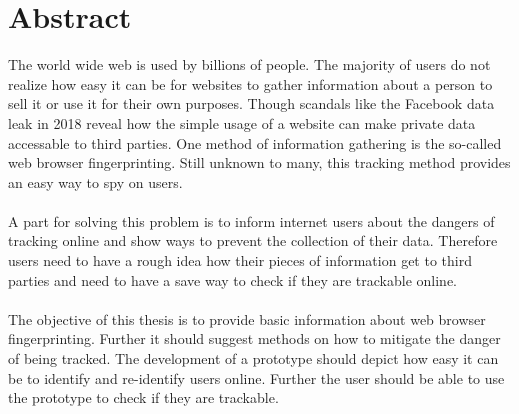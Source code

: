 \chapter{Abstract}

The world wide web is used by billions of people. The majority of users do not realize how easy it can be for websites to gather information about a person to sell it or use it for their own purposes. Though scandals like the Facebook data leak in 2018 reveal how the simple usage of a website can make private data accessable to third parties. One method of information gathering is the so-called web browser fingerprinting. Still unknown to many, this tracking method provides an easy way to spy on users.\\\\
A part for solving this problem is to inform internet users about the dangers of tracking online and show ways to prevent the collection of their data. Therefore users need to have a rough idea how their pieces of information get to third parties and need to have a save way to check if they are trackable online.\\\\
The objective of this thesis is to provide basic information about web browser fingerprinting. Further it should suggest methods on how to mitigate the danger of being tracked. The development of a prototype should depict how easy it can be to identify and re-identify users online. Further the user should be able to use the prototype to check if they are trackable.